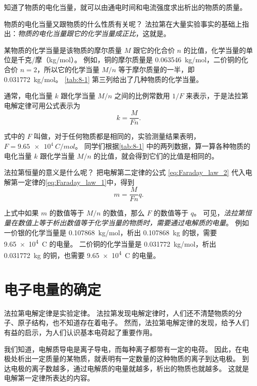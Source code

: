知道了物质的电化当量，就可以由通电时间和电流强度求出析出的物质的质量。

物质的电化当量又跟物质的什么性质有关呢？
法拉第在大量实验事实的基础上指出：\emph{物质的电化当量跟它的化学当量成正比}，这就是。

某物质的化学当量是该物质的摩尔质量 $M$ 跟它的化合价 $n$ 的比值，化学当量的单位是千克/摩（\unit{kg/mol}）。
例如，铜的摩尔质量是 \qty{0.063546}{kg/mol}，二价铜的化合价 $n=2$，所以它的化学当量 $M/n$ 等于摩尔质量的一半，即 \qty{0.031772}{kg/mol}。
\cref{tab:8-1} 第三列给出了几种物质的化学当量。

通常，电化当量 $k$ 跟化学当量 $M/n$ 之间的比例常数用 $1/F$ 来表示，于是法拉第电解定律可用公式表示为
\begin{equation}
  \label{eq:Faraday_law_2}
  k=\frac{M}{Fn}.
\end{equation}

式中的 $F$ 叫做，对于任何物质都是相同的，实验测量结果表明，$F=\qty{9.65e4}{C/mol}$。
同学们根据\cref{tab:8-1} 中的两列数据，算一算各种物质的电化当量 $k$ 跟化学当量 $M/n$ 的比值，就会得到它们的比值是相同的。

法拉第恒量的意义是什么呢？
把电解第二定律的公式 \eqref{eq:Faraday_law_2} 代入电解第一定律的\cref{eq:Faraday_law_1}中，得到
\begin{equation}
  m=\frac{M}{Fn}q.
\end{equation}

上式中如果 $m$ 的数值等于 $M/n$ 的数值，那么 $F$ 的数值等于 $q$。
可见，\emph{法拉第恒量在数值上等于析出数值等于化学当量的物质时，需要通过电解质的电量}。
例如一价银的化学当量是 \qty{0.107868}{kg/mol}，析出 \qty{0.107868}{kg} 的银，需要 \qty{9.65e4}{C} 的电量。
二价铜的化学当量是 \qty{0.031772}{kg/mol}，析出 \qty{0.031772}{kg} 的铜，也需要 \qty{9.65e4}{C} 的电量。

\section{电子电量的确定}
法拉第电解定律是实验定律。
法拉第发现电解定律时，人们还不清楚物质的分子、原子结构，也不知道存在着电子。
然而，法拉第电解定律的发现，给予人们有益的启示，为人们认识基本电荷起了重要作用。

我们知道，电解质导电是离子导电，而每种离子都带有一定的电荷。
因此，在电极处析出一定质量的某物质，就表明有一定数量的这种物质的离子到达电极。
到达电极的离子数越多，通过电解质的电量就越多，析出的物质也就越多。
这就是电解第一定律所表达的内容。

